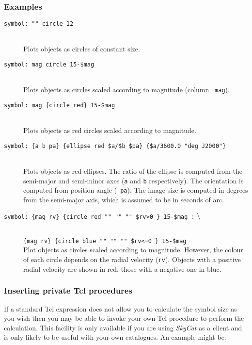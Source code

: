 \documentclass[twoside,11pt]{article}
\renewcommand{\_}{\texttt{\symbol{95}}}
\begin{document}
\subsubsection{Examples}

\begin{description}

  \item[{\tt symbol: "" circle 12}] ~ \\
   Plots objects as circles of constant size.

  \item[{\tt symbol: mag circle 15-\$mag}] ~ \\
   Plots objects as circles scaled according to magnitude (column {\tt
   mag}).

  \item[{\tt symbol: mag \{circle red\} 15-\$mag}] ~ \\
   Plots objects as red circles scaled according to magnitude.

  \item[{\tt symbol: \{a b pa\} \{ellipse red \$a/\$b \$pa\} 
   \{\$a/3600.0 "deg J2000"\} }] ~ \\
   Plots objects as red ellipses.  The ratio of the ellipse is computed
   from the semi-major and semi-minor axes ({\tt a} and {\tt b}
   respectively).  The orientation is computed from position angle ({\tt
   pa}).  The image size is computed in degrees from the semi-major axis,
   which is assumed to be in seconds of arc.

  \item[{\tt symbol: \{mag rv\} \{circle red "" "" "" \$rv>0 \} 15-\$mag :} 
   ${\tt \backslash}$] ~ \\
   {\tt \{mag rv\} \{circle blue "" "" "" \$rv<=0 \} 15-\$mag} \\
   Plot objects as circles scaled according to magnitude.  However,
   the colour of each circle depends on the radial velocity ({\tt rv}).
   Objects with a positive radial velocity are shown in red, those with
   a negative one in blue.

\end{description}

\subsubsection{Inserting private Tcl procedures}

If a standard Tcl expression does not allow you to calculate the symbol
size as you wish then you may be able to invoke your own Tcl procedure
to perform the calculation.  This facility is only available if you are
using {\it SkyCat}\/ as a client and is only likely to be useful with
your own catalogues.  An example might be:
\end{document}

